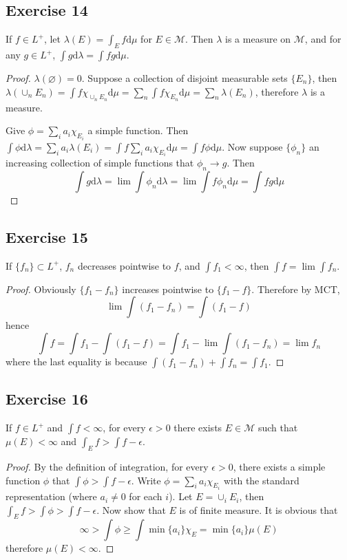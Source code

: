 \subsection*{Exercise 14}
If $f\in L^+$, let $\lambda(E)=\int_Ef\mathrm{d}\mu$ for $E\in\mathcal{M}$. Then $\lambda$ is a measure on $\mathcal{M}$, and for any $g\in L^+$, $\int g\mathrm{d}\lambda=\int fg\mathrm{d}\mu$.
\begin{proof}
    $\lambda(\varnothing)=0$. Suppose a collection of disjoint measurable sets $\{E_n\}$, then $\lambda(\cup_n E_n)=\int f\chi_{\cup_nE_n}\mathrm{d}\mu=\sum_n\int f\chi_{E_n}\mathrm{d}\mu=\sum_n\lambda(E_n)$, therefore $\lambda$ is a measure.
    \par Give $\phi=\sum_ia_i\chi_{E_i}$ a simple function. Then $\int\phi\mathrm{d}\lambda=\sum_ia_i\lambda(E_i)=\int f\sum_ia_i\chi_{E_i}\mathrm{d}\mu=\int f\phi\mathrm{d}\mu$. Now suppose $\{\phi_n\}$ an increasing collection of simple functions that $\phi_n\to g$. Then
    $$
    \int g\mathrm{d}\lambda=\lim\int\phi_n\mathrm{d}\lambda=\lim\int f\phi_n\mathrm{d}\mu=\int fg\mathrm{d}\mu
    $$
\end{proof}
\subsection*{Exercise 15}
If $\{f_n\}\subset L^+$, $f_n$ decreases pointwise to $f$, and $\int f_1<\infty$, then $\int f=\lim\int f_n$.
\begin{proof}
    Obviously $\{f_1-f_n\}$ increases pointwise to $\{f_1-f\}$. Therefore by MCT,
    $$
    \lim\int(f_1-f_n)=\int(f_1-f)
    $$
    hence
    $$
    \int f=\int f_1-\int (f_1-f)=\int f_1-\lim\int(f_1-f_n)=\lim f_n
    $$
    where the last equality is because $\int (f_1-f_n)+\int f_n=\int f_1$.
\end{proof}
\subsection*{Exercise 16}
If $f\in L^+$ and $\int f<\infty$, for every $\epsilon>0$ there exists $E\in\mathcal{M}$ such that $\mu(E)<\infty$ and $\int_E f>\int f-\epsilon$.
\begin{proof}
    By the definition of integration, for every $\epsilon>0$, there exists a simple function $\phi$ that $\int\phi>\int f-\epsilon$. Write $\phi=\sum_i a_i\chi_{E_i}$ with the standard representation (where $a_i\neq 0$ for each $i$). Let $E=\cup_iE_i$, then $\int_E f>\int\phi>\int f-\epsilon$. Now show that $E$ is of finite measure. It is obvious that
    $$
    \infty>\int\phi\ge\int\min\{a_i\}\chi_E=\min\{a_i\}\mu(E)
    $$
    therefore $\mu(E)<\infty$.
\end{proof}
